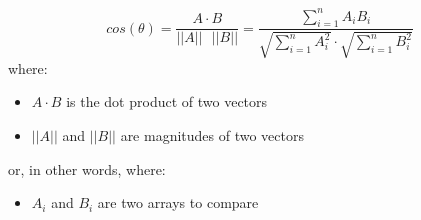 \documentclass[preview]{standalone}
\begin{document}
{\large
\[
cos(\theta)=\frac{A\cdot B}{||A||\text{ }||B||}=\frac{\sum^n_{i=1}A_iB_i}{\sqrt{\sum^n_{i=1}A^2_i}\cdot\sqrt{\sum^n_{i=1}B^2_i}}
\]
}
where:
\begin{itemize}
	\setlength\itemsep{0.1em}
	\item $A\cdot B$ is the dot product of two vectors
	\item $||A||$ and $||B||$ are magnitudes of two vectors
\end{itemize}
or, in other words, where:
\begin{itemize}
	\setlength\itemsep{0.1em}
	\item $A_i$ and $B_i$ are two arrays to compare
\end{itemize}
\end{document}
